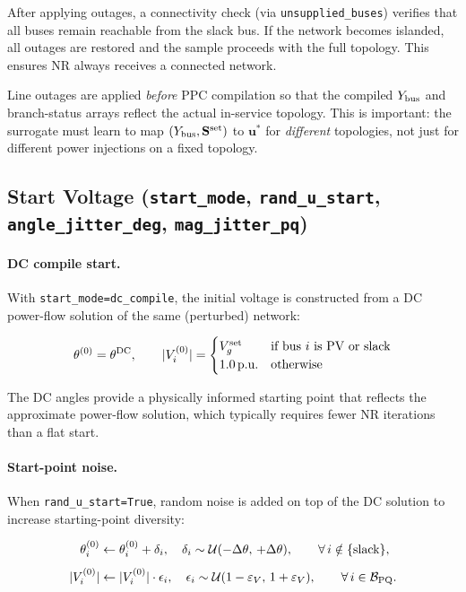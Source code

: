 \documentclass{article}
\begin{document}
After applying outages, a connectivity check (via \texttt{unsupplied\_buses})
verifies that all buses remain reachable from the slack bus.  If the network
becomes islanded, all outages are restored and the sample proceeds with the
full topology.  This ensures NR always receives a connected network.

Line outages are applied \emph{before} PPC compilation so that the compiled
$Y_{\rm bus}$ and branch-status arrays reflect the actual in-service topology.
This is important: the surrogate must learn to map $(Y_{\rm bus},
\mathbf{S}^{\rm set})$ to $\mathbf{u}^*$ for \emph{different} topologies, not
just for different power injections on a fixed topology.

\subsection{Start Voltage (\texttt{start\_mode}, \texttt{rand\_u\_start},
  \texttt{angle\_jitter\_deg}, \texttt{mag\_jitter\_pq})}

\paragraph{DC compile start.}
With \texttt{start\_mode=dc\_compile}, the initial voltage is constructed from
a DC power-flow solution of the same (perturbed) network:

\begin{equation}
  \theta^{(0)} = \theta^{\rm DC}, \qquad
  |V^{(0)}_{i}| =
  \begin{cases}
    V^{\rm set}_g & \text{if bus }i\text{ is PV or slack} \\
    1.0\,\text{p.u.} & \text{otherwise}
  \end{cases}
  \label{eq:dc_start}
\end{equation}

The DC angles provide a physically informed starting point that reflects the
approximate power-flow solution, which typically requires fewer NR iterations
than a flat start.

\paragraph{Start-point noise.}
When \texttt{rand\_u\_start=True}, random noise is added on top of the DC
solution to increase starting-point diversity:

\begin{align}
  \theta^{(0)}_{i} &\leftarrow \theta^{(0)}_{i} + \delta_i,
  \quad \delta_i \sim \mathcal{U}(-\Delta\theta,\, +\Delta\theta),
  \qquad \forall\, i \notin \{\text{slack}\},
  \label{eq:angle_jitter} \\[4pt]
  |V^{(0)}_{i}| &\leftarrow |V^{(0)}_{i}| \cdot \epsilon_i,
  \quad \epsilon_i \sim \mathcal{U}(1 - \varepsilon_V,\, 1 + \varepsilon_V),
  \qquad \forall\, i \in \mathcal{B}_{\rm PQ}.
  \label{eq:mag_jitter}
\end{align}
\end{document}
